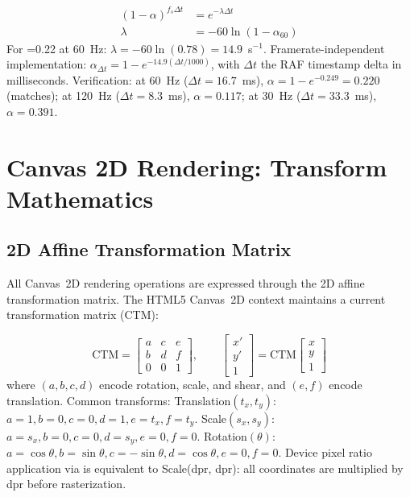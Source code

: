 \begin{eqblock}
\begin{align}
(1-\alpha)^{f_s \Delta t} &= e^{-\lambda\Delta t} \\
\lambda &= -60\ln(1-\alpha_{60})
\end{align}
For =0.22 at 60~Hz: $\lambda = -60\ln(0.78) = 14.9$~s$^{-1}$. Framerate-independent implementation: $\alpha_{\Delta t} = 1-e^{-14.9(\Delta t/1000)}$, with $\Delta t$ the RAF timestamp delta in milliseconds. Verification: at 60~Hz ($\Delta t=16.7$~ms), $\alpha = 1-e^{-0.249} = 0.220$ (matches); at 120~Hz ($\Delta t=8.3$~ms), $\alpha=0.117$; at 30~Hz ($\Delta t=33.3$~ms), $\alpha=0.391$.
\end{eqblock}

\section{Canvas 2D Rendering: Transform Mathematics}

\subsection{2D Affine Transformation Matrix}

All Canvas~2D rendering operations are expressed through the 2D affine transformation matrix. The HTML5 Canvas~2D context maintains a current transformation matrix (CTM):

\begin{eqblock}
\begin{equation}
\text{CTM} = \begin{bmatrix} a & c & e \\ b & d & f \\ 0 & 0 & 1 \end{bmatrix}, \qquad
\begin{bmatrix} x'\\y'\\1 \end{bmatrix} = \text{CTM}\begin{bmatrix} x\\y\\1 \end{bmatrix}
\end{equation}
where $(a,b,c,d)$ encode rotation, scale, and shear, and $(e,f)$ encode translation. Common transforms: Translation$(t_x,t_y)$: $a{=}1,b{=}0,c{=}0,d{=}1,e{=}t_x,f{=}t_y$. Scale$(s_x,s_y)$: $a{=}s_x,b{=}0,c{=}0,d{=}s_y,e{=}0,f{=}0$. Rotation$(\theta)$: $a{=}\cos\theta,b{=}\sin\theta,c{=}-\sin\theta,d{=}\cos\theta,e{=}0,f{=}0$. Device pixel ratio application via  is equivalent to Scale(dpr, dpr): all coordinates are multiplied by dpr before rasterization.
\end{eqblock}

